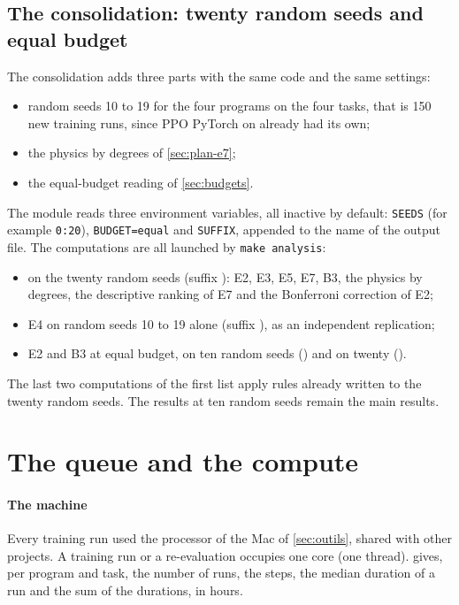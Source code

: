 \subsection{The consolidation: twenty random seeds and equal budget}\label{sec:plan-consolidation}
The consolidation adds three parts with the same code and the same settings:
\begin{itemize}
  \item random seeds 10 to 19 for the four programs on the four tasks, that is 150 new training runs, since
    PPO PyTorch on  already had its own;
  \item the physics by degrees of \cref{sec:plan-e7};
  \item the equal-budget reading of \cref{sec:budgets}.
\end{itemize}
The module  reads three environment variables, all inactive by default:
\texttt{SEEDS} (for example \texttt{0:20}), \texttt{BUDGET=equal} and \texttt{SUFFIX}, appended to the name of
the output file. The computations are all launched by \texttt{make analysis}:
\begin{itemize}
  \item on the twenty random seeds (suffix ): E2, E3, E5, E7, B3, the physics by degrees, the
    descriptive ranking of E7 and the Bonferroni correction of E2;
  \item E4 on random seeds 10 to 19 alone (suffix ), as an independent replication;
  \item E2 and B3 at equal budget, on ten random seeds () and on twenty ().
\end{itemize}
The last two computations of the first list apply rules already written to the twenty random seeds. The results
at ten random seeds remain the main results.

\section{The queue and the compute}\label{sec:calcul}

\paragraph{The machine}
Every training run used the processor of the Mac of \cref{sec:outils}, shared with other projects. A training
run or a re-evaluation occupies one core (one thread).  gives, per program and task, the
number of runs, the steps, the median duration of a run and the sum of the durations, in hours.

